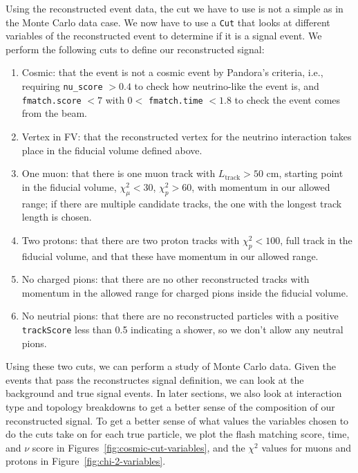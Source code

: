 \documentclass{article}
\begin{document}
Using the reconstructed event data, the cut we have to use is not a simple as in the Monte Carlo data case. 
We now have to use a \verb|Cut| that looks at different variables of the reconstructed event to determine if 
it is a signal event. We perform the following cuts to define our reconstructed signal:
\begin{enumerate}[label=(\roman*)]
    \item Cosmic: that the event is not a cosmic event by Pandora's criteria, i.e., requiring \verb|nu_score| $> 0.4$ to 
    check how neutrino-like the event is, and \verb|fmatch.score| $< 7$ with $0 <$ \verb|fmatch.time| $< 1.8$ to check the event comes from the beam.
    \item Vertex in FV\@: that the reconstructed vertex for the neutrino interaction takes place in the fiducial volume defined above.
    \item One muon: that there is one muon track with $L_{\text{track}} > 50$ cm, starting point in the fiducial volume, $\chi^2_\mu < 30$, $\chi^2_p > 60$, with momentum in our allowed range; if
    there are multiple candidate tracks, the one with the longest track length is chosen.
    \item Two protons: that there are two proton tracks with $\chi^2_p < 100$, full track in the fiducial volume, and that these have momentum in our allowed range.
    \item No charged pions: that there are no other reconstructed tracks with momentum in the allowed range for charged pions inside the fiducial volume.
    \item No neutrial pions: that there are no reconstructed particles with a positive \verb|trackScore| less than 0.5 indicating a shower, so we don't allow any neutral pions.
\end{enumerate}

Using these two cuts, we can perform a study of Monte Carlo data. Given the events that pass the
reconstructes signal definition, we can look at the background and true signal events. In later sections, 
we also look at interaction type and topology breakdowns to get a better sense of the composition of our reconstructed signal.
To get a better sense of what values the variables chosen to do the cuts take on for each true particle, we plot
the flash matching score, time, and $\nu$ score in Figures~\ref{fig:cosmic-cut-variables}, and the $\chi^2$ values for muons and protons in Figure~\ref{fig:chi-2-variables}.
\end{document}
